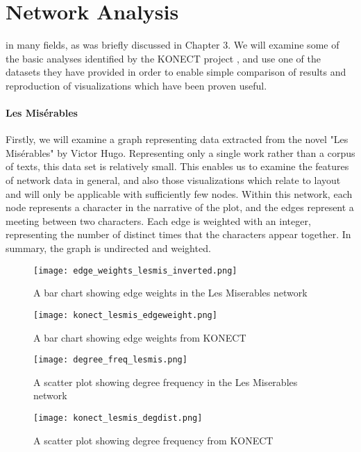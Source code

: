 \section{Network Analysis}
\label{sec:network}
 in many fields, as was briefly discussed in Chapter 3. We will examine some of the basic analyses identified by the KONECT project \cite{Kunegis2013}, and use one of the datasets they have provided in order to enable simple comparison of results and reproduction of visualizations which have been proven useful.

\paragraph{Les Misérables}
Firstly, we will examine a graph representing data extracted from the novel "Les Misérables" by Victor Hugo. Representing only a single work rather than a corpus of texts, this data set is relatively small. This enables us to examine the features of network data in general, and also those visualizations which relate to layout and will only be applicable with sufficiently few nodes. Within this network, each node represents a character in the narrative of the plot, and the edges represent a meeting between two characters. Each edge is weighted with an integer, representing the number of distinct times that the characters appear together. In summary, the graph is undirected and weighted.

\begin{figure}
	\centering
	\begin{minipage}{0.45\textwidth}
		\centering
		\label{fig:edgeweightslesmis}
		\texttt{[image: edge\_weights\_lesmis\_inverted.png]}
		\caption{A bar chart showing edge weights in the Les Miserables network}
	\end{minipage}\hfill
	\begin{minipage}{0.45\textwidth}
		\centering
		\label{fig:edgeweightskonect}
		\texttt{[image: konect\_lesmis\_edgeweight.png]}
		\caption{A bar chart showing edge weights from KONECT}
	\end{minipage}
\end{figure}

\begin{figure}
	\centering
	\begin{minipage}{0.45\textwidth}
		\centering
		\label{fig:edgeweightslesmis}
		\texttt{[image: degree\_freq\_lesmis.png]}
		\caption{A scatter plot showing degree frequency in the Les Miserables network}
	\end{minipage}\hfill
	\begin{minipage}{0.45\textwidth}
		\centering
		\label{fig:edgeweightskonect}
		\texttt{[image: konect\_lesmis\_degdist.png]}
		\caption{A scatter plot showing degree frequency from KONECT}
	\end{minipage}
\end{figure}

